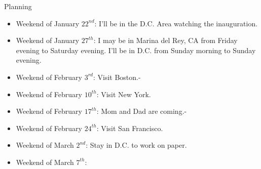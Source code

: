 \documentclass[serif, mathserif, final]{beamer}
\newcommand{\te}[1]{\textit{TimeEst:}\textit{#1}}
\newcommand{\dl}[1]{\textit{Deadline:}\textit{#1}}
\begin{document}
\begin{frame}
\begin{columns}
\begin{column}{0.5\textwidth}
\begin{block}{Planning}
\begin{itemize}
\item \tiny Weekend of January $22^{nd}$: I'll be in the D.C. Area
  watching the inauguration.
\item \tiny Weekend of January $27^{th}$: I may be in Marina del Rey,
  CA from Friday evening to Saturday evening. I'll be in D.C. from
  Sunday morning to Sunday evening.
\item \tiny Weekend of February $3^{rd}$: Visit Boston.- 
\item \tiny Weekend of February $10^{th}$: Visit New York.
\item \tiny Weekend of February $17^{th}$: Mom and Dad are coming.-
\item \tiny Weekend of February $24^{th}$: Visit San Francisco.
\item \tiny Weekend of March $2^{nd}$: Stay in D.C. to work on paper. 
\item \tiny Weekend of March $7^{th}$:
\end{itemize}
\end{block}
\end{column} %
\end{columns}

\end{frame}
\end{document}
